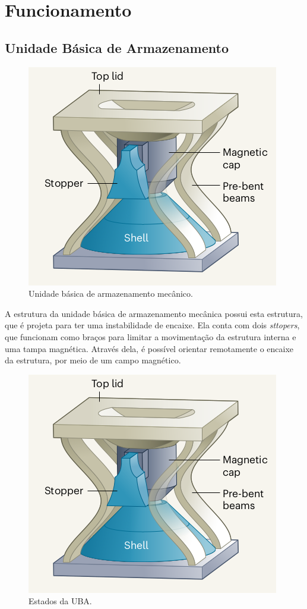 \section{Funcionamento}

\subsection{Unidade Básica de Armazenamento}
\begin{figure}[H]
    \centering
    \includegraphics[scale = 0.5]{source/pictures/shell.png}
    \caption{Unidade básica de armazenamento mecânico\cite{coulais2021snappy}.}
    \label{fig:uba}
\end{figure}

A estrutura da unidade básica de armazenamento mecânica possui esta estrutura, que é projeta para ter uma instabilidade de encaixe. Ela conta com dois \textit{sttopers}, que funcionam como braços para limitar a movimentação da estrutura interna e uma tampa magnética. Através dela, é possível orientar remotamente o encaixe da estrutura, por meio de um campo magnético.


\begin{figure}[H]
    \centering
    \includegraphics[scale = 0.5]{source/pictures/shell.png}
    \caption{Estados da UBA\cite{coulais2021snappy}.}
    \label{fig:uba-states}
\end{figure}

